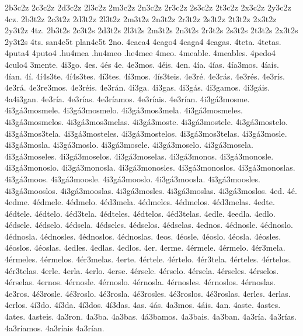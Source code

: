 {2b3c2z 2c3c2z 2d3c2z 2l3c2z 2m3c2z 2n3c2z 2r3c2z 2s3c2z 2t3c2z 2x3c2z 2y3c2z 4cz.
2b3t2z 2c3t2z 2d3t2z 2l3t2z 2m3t2z 2n3t2z 2r3t2z 2s3t2z 2t3t2z 2x3t2z 2y3t2z 4tz.
2b3t2s 2c3t2s 2d3t2s 2l3t2s 2m3t2s 2n3t2s 2r3t2s 2s3t2s 2t3t2s 2x3t2s 2y3t2s 4ts.
san4c5t
plan4c5t
2no.
4caca4 4cago4 4caga4 4cagas. 4teta. 4tetas. 4puta4 4puto4 .hu4mea .hu4meo .he4mee
4meo. 4meable. 4meables. 4pedo4 4culo4
3mente.
4i3go. 4es. 4^^e9s 4e. 4e3mos. 4^^e9is. 4en.
4^^eda. 4^^edas. 4^^eda3mos. 4^^edais. 4^^edan.
4^^ed. 4^^ed4s3te. 4^^ed4s3tes. 4^^ed3tes. 4^^ed3mos. 4^^eds3teis.
4e3r^^e9. 4e3r^^e1s. 4e3r^^e9s. 4e3r^^eds. 4e3r^^e1. 4e3re3mos. 4e3r^^e9is. 4e3r^^e1n.
4i3ga. 4i3gas. 4i3g^^e1s. 4i3gamos. 4i3g^^e1is. 4a4i3gan.
4e3r^^eda. 4e3r^^edas. 4e3r^^edamos. 4e3r^^edais. 4e3r^^edan.
4i3g^^e13mosme.
4i3g^^e13mosmele. 4i3g^^e13mosmelo. 4i3g^^e13mos3mela.
4i3g^^e13mosmeles. 4i3g^^e13mosmelos. 4i3g^^e13mos3melas.
4i3g^^e13moste.
4i3g^^e13mostele. 4i3g^^e13mostelo. 4i3g^^e13mos3tela.
4i3g^^e13mosteles. 4i3g^^e13mostelos. 4i3g^^e13mos3telas.
4i3g^^e13mosle. 4i3g^^e13mosla. 4i3g^^e13moslo.
4i3g^^e13mosele. 4i3g^^e13moselo. 4i3g^^e13mosela.
4i3g^^e13moseles. 4i3g^^e13moselos. 4i3g^^e13moselas.
4i3g^^e13monos.
4i3g^^e13monosle. 4i3g^^e13monoslo. 4i3g^^e13monosla.
4i3g^^e13monosles. 4i3g^^e13monoslos. 4i3g^^e13monoslas.
4i3g^^e13moos.
4i3g^^e13moosle. 4i3g^^e13mooslo. 4i3g^^e13moosla.
4i3g^^e13moosles. 4i3g^^e13mooslos. 4i3g^^e13mooslas.
4i3g^^e13mosles. 4i3g^^e13moslas. 4i3g^^e13moslos.
4ed. 4^^e9.
4edme.
4^^e9dmele. 4^^e9dmelo. 4^^e9d3mela.
4^^e9dmeles. 4^^e9dmelos. 4^^e9d3melas.
4edte.
4^^e9dtele. 4^^e9dtelo. 4^^e9d3tela.
4^^e9dteles. 4^^e9dtelos. 4^^e9d3telas.
4edle. 4eedla. 4edlo.
4^^e9dsele. 4^^e9dselo. 4^^e9dsela.
4^^e9dseles. 4^^e9dselos. 4^^e9dselas.
4ednos.
4^^e9dnosle. 4^^e9dnoslo. 4^^e9dnosla.
4^^e9dnosles. 4^^e9dnoslos. 4^^e9dnoslas.
4eos.
4^^e9osle. 4^^e9oslo. 4^^e9osla.
4^^e9osles. 4^^e9oslos. 4^^e9oslas.
4edles. 4edlas. 4edlos.
4er.
4erme.
4^^e9rmele. 4^^e9rmelo. 4^^e9r3mela.
4^^e9rmeles. 4^^e9rmelos. 4^^e9r3melas.
4erte.
4^^e9rtele. 4^^e9rtelo. 4^^e9r3tela.
4^^e9rteles. 4^^e9rtelos. 4^^e9r3telas.
4erle. 4erla. 4erlo.
4erse.
4^^e9rsele. 4^^e9rselo. 4^^e9rsela.
4^^e9rseles. 4^^e9rselos. 4^^e9rselas.
4ernos.
4^^e9rnosle. 4^^e9rnoslo. 4^^e9rnosla.
4^^e9rnosles. 4^^e9rnoslos. 4^^e9rnoslas.
4e3ros.
4^^e93rosle. 4^^e93roslo. 4^^e93rosla.
4^^e93rosles. 4^^e93roslos. 4^^e93roslas.
4erles. 4erlas. 4erlos.
4^^ed3do. 4^^ed3da. 4^^ed3dos. 4^^ed3das.
4as. 4^^e1s. 4a3mos. 4^^e1is. 4an.
4aste. 4astes. 4ates. 4asteis. 4a3ron.
4a3ba. 4a3bas. 4^^e13bamos. 4a3bais. 4a3ban.
4a3r^^eda. 4a3r^^edas. 4a3r^^edamos. 4a3r^^edais 4a3r^^edan.
}
